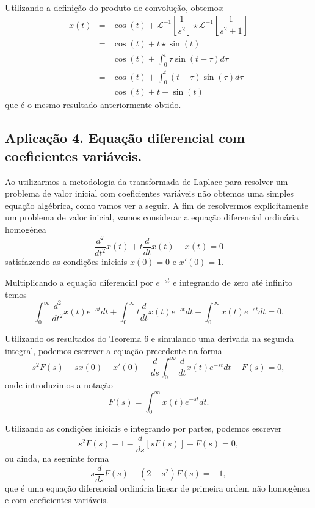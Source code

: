 Utilizando a definição do produto de convolução, obtemos:
$$\begin{array}{rcl}
x(t)
&=&
\cos(t) + \mathscr{L}^{-1}
\left[
\dfrac{1}{s^{2}}
\right]
\star \mathscr{L}^{-1}
\left[
\dfrac{1}{s^{2} + 1}
\right] \\
&=&
\cos(t) + t \star \sin(t) \\[0.5cm]
&=&
\cos(t) + \displaystyle \int_{0}^{t} \tau \sin(t - \tau) d\tau \\[0.5cm]
&=&
\cos(t) + \displaystyle\int_{0}^{t} (t - \tau) \sin(\tau) d\tau \\[0.5cm]
&=&
\cos(t) + t - \sin(t)
\end{array}$$
que é o mesmo resultado anteriormente obtido.




\subsection{Aplicação 4. Equação diferencial com coeficientes variáveis.}

Ao utilizarmos a metodologia da transformada de Laplace para resolver um problema de valor inicial com coeficientes variáveis não obtemos uma simples equação algébrica, como vamos ver a seguir. A fim de resolvermos explicitamente um problema de valor inicial, vamos considerar a equação diferencial ordinária homogênea
$$\dfrac{d^{2}}{dt^{2}} x(t) + t \dfrac{d}{dt} x(t) - x(t) = 0$$
satisfazendo as condições iniciais $x(0) = 0$ e $x'(0) = 1$.

Multiplicando a equação diferencial por $e^{-st}$ e integrando de zero até infinito temos
$$\int_{0}^{\infty}
\dfrac{d^{2}}{dt^{2}} x(t) e^{-st}dt+
\int_{0}^{\infty}
t
\dfrac{d}{dt}
x(t) e^{-st}dt -
\int_{0}^{\infty} x(t) e^{-st}dt = 0.$$

Utilizando os resultados do Teorema 6 e simulando uma derivada na segunda integral, podemos escrever a equação precedente na forma
$$s^{2}F(s)-sx(0)-x'(0)-
\dfrac{d}{ds}
\int_{0}^{\infty}
\dfrac{d}{dt} x(t) e^{-st}dt-F(s) = 0,$$
onde introduzimos a notação
$$F(s) =
\int_{0}^{\infty}
x(t) e^{-st}dt.$$

Utilizando as condições iniciais e integrando por partes, podemos escrever
$$s^{2}F(s) - 1 - \dfrac{d}{ds} [sF(s)] - F(s) = 0,$$
ou ainda, na seguinte forma
$$s
\dfrac{d}{ds}
F(s) + (2 - s^{2})F(s) = -1,$$
que é uma equação diferencial ordinária linear de primeira ordem não homogênea e com coeficientes variáveis.

